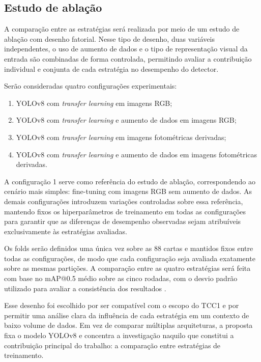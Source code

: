 \documentclass[
    12pt,                %
    openright,           %
    oneside,             %
    a4paper,             %
    english,             %
    brazil               %
]{abntex2}
\begin{document}
\subsection{Estudo de ablação}
\label{subsec:ablacao}

A comparação entre as estratégias será realizada por meio de um
estudo de ablação com desenho fatorial. Nesse tipo de desenho,
duas variáveis independentes, o uso de aumento de dados e o
tipo de representação visual da entrada são combinadas de
forma controlada, permitindo avaliar a contribuição individual
e conjunta de cada estratégia no desempenho do detector.

Serão consideradas quatro configurações experimentais:

\begin{enumerate}
    \item YOLOv8 com \textit{transfer learning} em imagens RGB;
    \item YOLOv8 com \textit{transfer learning} e aumento de dados 
    em imagens RGB;
    \item YOLOv8 com \textit{transfer learning} em imagens 
    fotométricas derivadas;
    \item YOLOv8 com \textit{transfer learning} e aumento de dados 
    em imagens fotométricas derivadas.
\end{enumerate}

A configuração 1 serve como referência do estudo de ablação,
correspondendo ao cenário mais simples: fine-tuning com imagens
RGB sem aumento de dados. As demais configurações introduzem
variações controladas sobre essa referência, mantendo fixos
os hiperparâmetros de treinamento em todas as configurações
para garantir que as diferenças de desempenho observadas sejam
atribuíveis exclusivamente às estratégias avaliadas.

Os folds serão definidos uma única vez sobre as 88 cartas e mantidos
fixos entre todas as configurações, de modo que cada configuração seja
avaliada exatamente sobre as mesmas partições. A comparação entre
as quatro estratégias será feita com base no mAP@0.5 médio sobre
as cinco rodadas, com o desvio padrão utilizado para avaliar a
consistência dos resultados \cite{Kohavi1995}.

Esse desenho foi escolhido por ser compatível com o escopo do TCC1 e por 
permitir uma análise clara da influência de cada estratégia em um contexto 
de baixo volume de dados. Em vez de comparar múltiplas arquiteturas, a proposta 
fixa o modelo YOLOv8 e concentra a investigação naquilo que constitui a 
contribuição principal do trabalho: a comparação entre estratégias de treinamento.
\end{document}
